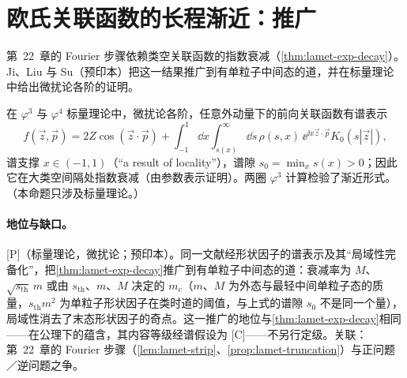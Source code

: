 \section{欧氏关联函数的长程渐近：推广}\label{sec:yzliu-decay}

第~22~章的 Fourier 步骤依赖类空关联函数的指数衰减（\cref{thm:lamet-exp-decay}）。Ji、Liu 与 Su\cite{Ji:2026vir}（预印本）把这一结果推广到有单粒子中间态的道，并在标量理论中给出微扰论各阶的证明。

\begin{proposition}\label{prop:yzliu-decay-extensions}
在 $\varphi^3$ 与 $\varphi^4$ 标量理论中，微扰论各阶，任意外动量下的前向关联函数有谱表示
\begin{equation}\label{eq:yzliu-decay-spectral}
f(\vec z,\vec p)=2Z\cos(\vec z\cdot\vec p)+\int_{-1}^1\dd x\int_{s(x)}^\infty\dd s\,\rho(s,x)\,\ee^{\ii x\vec z\cdot\vec p}K_0(s|\vec z|),
\end{equation}
谱支撑 $x\in(-1,1)$（“a result of locality”），谱隙 $s_0=\min_xs(x)>0$；因此它在大类空间隔处指数衰减（由参数表示证明\cite[第~5.3~节]{Ji:2026vir}）。两圈 $\varphi^3$ 计算检验了渐近形式。（本命题只涉及标量理论。）
\end{proposition}

\paragraph{地位与缺口。}[P]（标量理论，微扰论；预印本\cite[第~1--2、5、6~节]{Ji:2026vir}）。同一文献经形状因子的谱表示及其“局域性完备化”，把\cref{thm:lamet-exp-decay}推广到有单粒子中间态的道：衰减率为 $M$、$\sqrt{s_{\mathrm{th}}}\,m$ 或由 $s_{\mathrm{th}}$、$m$、$M$ 决定的 $m_c$（$m$、$M$ 为外态与最轻中间单粒子态的质量，$s_{\mathrm{th}}m^2$ 为单粒子形状因子在类时道的阈值，与上式的谱隙 $s_0$ 不是同一个量）\cite[式~(5.19)--(5.23)]{Ji:2026vir}，局域性消去了末态形状因子的奇点。这一推广的地位与\cref{thm:lamet-exp-decay}相同——在公理下的蕴含，其内容等级经谱假设为 [C]——不另行定级。关联：第~22~章的 Fourier 步骤（\cref{lem:lamet-strip}、\cref{prop:lamet-truncation}）与正问题／逆问题之争。
